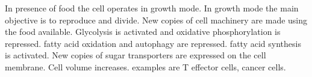 In presence of food the cell operates in growth mode. In growth mode the main objective is to reproduce and divide. New copies of cell machinery are made using the food available. Glycolysis is activated and oxidative phosphorylation is repressed. fatty acid oxidation and autophagy are repressed. fatty acid synthesis is activated. New copies of sugar transporters are expressed on the cell membrane. Cell volume increases. examples are T effector cells, cancer cells.